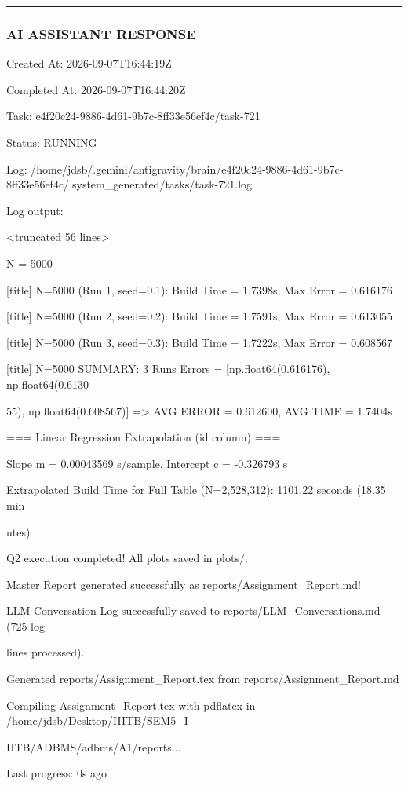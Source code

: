 \documentclass[11pt,a4paper]{article}
\begin{document}
\hrule

\subsubsection{AI ASSISTANT RESPONSE}

Created At: 2026-09-07T16:44:19Z

Completed At: 2026-09-07T16:44:20Z

Task: e4f20c24-9886-4d61-9b7c-8ff33e56ef4c/task-721

Status: RUNNING

Log: /home/jdsb/.gemini/antigravity/brain/e4f20c24-9886-4d61-9b7c-8ff33e56ef4c/.system\_generated/tasks/task-721.log

Log output:

<truncated 56 lines>

N = 5000 ---

[title] N=5000 (Run 1, seed=0.1): Build Time = 1.7398s, Max Error = 0.616176

[title] N=5000 (Run 2, seed=0.2): Build Time = 1.7591s, Max Error = 0.613055

[title] N=5000 (Run 3, seed=0.3): Build Time = 1.7222s, Max Error = 0.608567

[title] N=5000 SUMMARY: 3 Runs Errors = [np.float64(0.616176), np.float64(0.6130

55), np.float64(0.608567)] => AVG ERROR = 0.612600, AVG TIME = 1.7404s


=== Linear Regression Extrapolation (id column) ===

Slope m = 0.00043569 s/sample, Intercept c = -0.326793 s

Extrapolated Build Time for Full Table (N=2,528,312): 1101.22 seconds (18.35 min

utes)

Q2 execution completed! All plots saved in plots/.

Master Report generated successfully as reports/Assignment\_Report.md!

LLM Conversation Log successfully saved to reports/LLM\_Conversations.md (725 log

lines processed).

Generated reports/Assignment\_Report.tex from reports/Assignment\_Report.md

Compiling Assignment\_Report.tex with pdflatex in /home/jdsb/Desktop/IIITB/SEM5\_I

IITB/ADBMS/adbms/A1/reports...


Last progress: 0s ago
\end{document}

